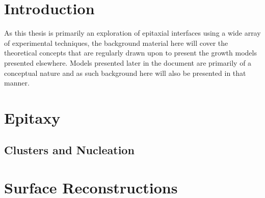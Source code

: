 \section{Introduction}
As this thesis is primarily an exploration of epitaxial interfaces using a wide array of experimental techniques, the background material here will cover the theoretical concepts that are regularly drawn upon to present the growth models presented elsewhere. Models presented later in the document are primarily of a conceptual nature and as such background here will also be presented in that manner.

\section{Epitaxy}

\subsection{Clusters and Nucleation}

\section{Surface Reconstructions}

